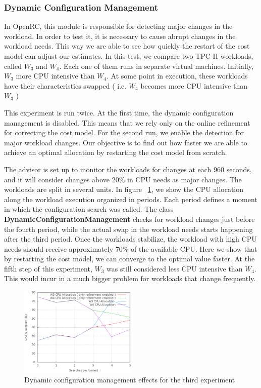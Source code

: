\documentclass[jidm,a4paper]{jidm} %
\begin{document}
\subsubsection{Dynamic Configuration Management}

In OpenRC, this module is responsible for detecting major changes in the workload. In order to test it, it is necessary to cause abrupt changes in the workload needs. This way we are able to see how quickly the restart of the cost model can adjust our estimates. In this test, we compare two TPC-H workloads, called $W_{3}$ and $W_{4}$. Each one of them runs in separate virtual machines. Initially, $W_{3}$ more CPU intensive than $W_{4}$. At some point in execution, these workloads have their characteristics swapped ( i.e. $W_{4}$ becomes more CPU intensive than $W_{3}$ )

This experiment is run twice. At the first time, the dynamic configuration management is disabled. This means that we rely only on the online refinement for correcting the cost model. For the second run, we enable the detection for major workload changes. Our objective is to find out how faster we are able to achieve an optimal allocation by restarting the cost model from scratch.

The advisor is set up to monitor the workloads for changes at each $960$ seconds, and it will consider changes above $20\%$ in CPU needs as major changes. The workloads are split in several units. In figure ~\ref{fig:wkchanges}, we show the CPU allocation along the workload execution organized in periods. Each period defines a moment in which the configuration search was called. The class \textbf{DynamicConfigurationManagement} checks for workload changes just before the fourth period, while the actual swap in the workload needs starts happening after the third period. Once the workloads stabilize, the workload with high CPU needs should receive approximately $70\%$  of the available CPU. Here we show that by restarting the cost model, we can converge to the optimal value faster. At the fifth step of this experiment, $W_{3}$  was still considered less CPU intensive than $W_{4}$. This would incur in a much bigger problem for workloads that change frequently.

\begin{figure}[t]
 \centering
 \includegraphics[width=0.5\textwidth]{dyn-change.eps}
 \caption{Dynamic configuration management effects for the third experiment}
 \label{fig:wkchanges}
\end{figure} 
\end{document}
